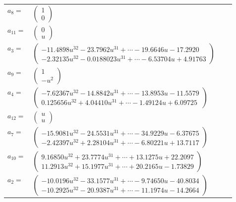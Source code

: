 \documentclass[1p]{elsarticle_modified}
\theoremstyle{definition}
\begin{document}
\begin{tabular}{m{7pt} m{180pt} m{7pt} m{180pt} }
\flushright $a_{8}=$&$\begin{pmatrix}1\\0\end{pmatrix}$ \\
\flushright $a_{11}=$&$\begin{pmatrix}0\\u\end{pmatrix}$ \\
\flushright $a_{3}=$&$\begin{pmatrix}-11.4898 u^{32}-23.7962 u^{31}+\cdots-19.6646 u-17.2920\\-2.32135 u^{32}-0.0188023 u^{31}+\cdots-6.53704 u+4.91763\end{pmatrix}$ \\
\flushright $a_{9}=$&$\begin{pmatrix}1\\- u^2\end{pmatrix}$ \\
\flushright $a_{4}=$&$\begin{pmatrix}-7.62367 u^{32}-14.8842 u^{31}+\cdots-13.8953 u-11.5579\\0.125656 u^{32}+4.04410 u^{31}+\cdots-1.49124 u+6.09725\end{pmatrix}$ \\
\flushright $a_{12}=$&$\begin{pmatrix}u\\u\end{pmatrix}$ \\
\flushright $a_{7}=$&$\begin{pmatrix}-15.9081 u^{32}-24.5531 u^{31}+\cdots-34.9229 u-6.37675\\-2.42397 u^{32}+2.28104 u^{31}+\cdots-6.80221 u+13.7117\end{pmatrix}$ \\
\flushright $a_{10}=$&$\begin{pmatrix}9.16850 u^{32}+23.7774 u^{31}+\cdots+13.1275 u+22.2097\\11.2913 u^{32}+15.1977 u^{31}+\cdots+20.2165 u-1.73829\end{pmatrix}$ \\
\flushright $a_{2}=$&$\begin{pmatrix}-10.0196 u^{32}-33.1577 u^{31}+\cdots-9.74650 u-40.8034\\-10.2925 u^{32}-20.9387 u^{31}+\cdots-11.1974 u-14.2664\end{pmatrix}$ \\

\end{tabular}
\end{document}
